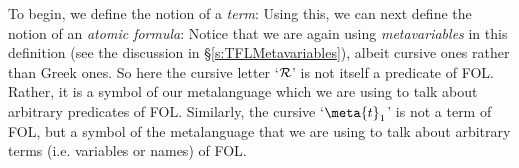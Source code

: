 To begin, we define the notion of a \emph{term}:
Using this, we can next define the notion of an \emph{atomic formula}:
Notice that we are again using \emph{metavariables} in this definition (see the discussion in \S\ref{s:TFLMetavariables}), albeit cursive ones rather than Greek ones. So here the cursive letter `$\mathcal{R}$' is not itself a predicate of FOL. Rather, it is a symbol of our metalanguage  which we are using to talk about arbitrary predicates of FOL. Similarly, the cursive `$\meta{t}_1$' is not a term of FOL, but a symbol of the metalanguage that we are using to talk about arbitrary terms (i.e. variables or names) of FOL.

